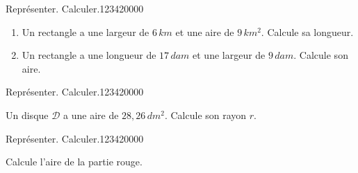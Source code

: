 \begin{pageParcourst}


\begin{ExoCt}{Représenter. Calculer.}{1234}{2}{0}{0}{0}{0}
 
\begin{enumerate}
\item Un rectangle a une largeur de $6\,km$ et une aire de $9\,km^2$. Calcule sa longueur.
\item Un rectangle a une longueur de $17\,dam$ et une largeur de $9\,dam$. Calcule son aire.
\end{enumerate}
 
\end{ExoCt}

\begin{ExoCt}{Représenter. Calculer.}{1234}{2}{0}{0}{0}{0}
 
 

Un disque $\mathcal{D}$ a une aire de $28,26\,dm^2$. Calcule son rayon $r$.
 
\end{ExoCt}

\begin{ExoCt}{Représenter. Calculer.}{1234}{2}{0}{0}{0}{0}

\begin{minipage}{0.58\linewidth}

Calcule l'aire de la partie rouge. 
\end{minipage}
\hfill
\begin{minipage}{0.38\linewidth}


\end{minipage}
\end{ExoCt}
\end{pageParcourst}

